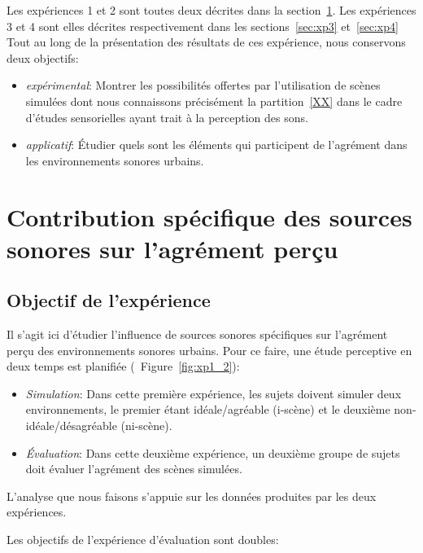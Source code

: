 Les expériences 1 et 2 sont toutes deux décrites dans la section~\ref{sec:xp1_2}. Les expériences 3 et 4 sont elles décrites respectivement dans les sections~\ref{sec:xp3} et~\ref{sec:xp4}  \\


Tout au long de la présentation des résultats de ces expérience, nous conservons deux objectifs:

\begin{itemize}
\item \emph{expérimental}: Montrer les possibilités offertes par l'utilisation de scènes simulées  dont nous connaissons précisément la partition~\ref{XX} dans le cadre d'études sensorielles ayant trait à la perception des sons.
\item \emph{applicatif}: Étudier quels sont les éléments qui participent de l'agrément dans les environnements sonores urbains. 
\end{itemize}

\section{Contribution spécifique des sources sonores sur l'agrément perçu}
\label{sec:xp1_2}

\subsection{Objectif de l'expérience}

Il s'agit ici d'étudier l'influence de sources sonores spécifiques sur l'agrément perçu des environnements sonores urbains. Pour ce faire, une étude perceptive en deux temps est planifiée (\Cf~Figure~\ref{fig:xp1_2}):

\begin{itemize}
\item \emph{Simulation}: Dans cette première expérience, les sujets doivent simuler deux environnements, le premier étant idéale/agréable (i-scène) et le deuxième non-idéale/désagréable (ni-scène).
\item \emph{Évaluation}: Dans cette deuxième expérience, un deuxième groupe de sujets doit évaluer l'agrément des scènes simulées.
\end{itemize}

L'analyse que nous faisons s'appuie sur les données produites par les deux expériences.

Les objectifs de l'expérience d'évaluation sont doubles:

